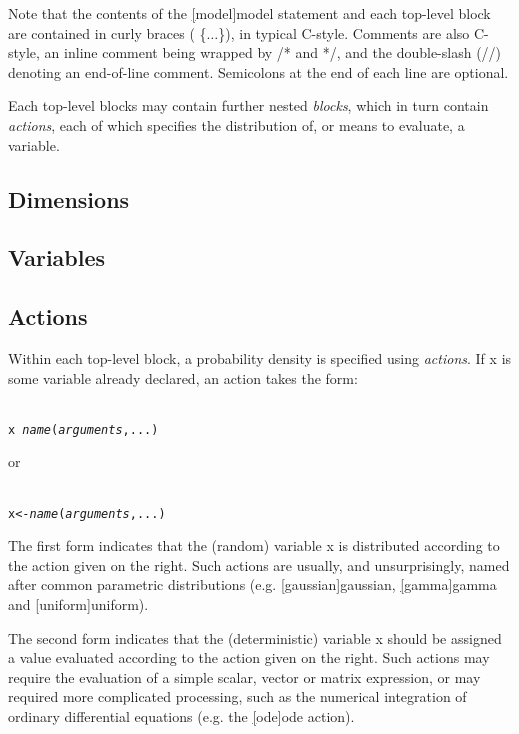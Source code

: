 Note that the contents of the \hyperref[hyper][model]{\sf model}
statement and each top-level block are contained in curly braces ({\sf
\{\(\ldots\)\}}), in typical C-style. Comments are also C-style, an inline
comment being wrapped by \textsf{/*} and \textsf{*/}, and the double-slash
(\textsf{//}) denoting an end-of-line comment. Semicolons at the end of each
line are optional.

Each top-level blocks may contain further nested \emph{blocks}, which
in turn contain \emph{actions}, each of which specifies the distribution of,
or means to evaluate, a variable.

\subsection{Dimensions\label{Dimensions}}

\subsection{Variables\label{Variables}}

\subsection{Actions\label{Actions}}

Within each top-level block, a probability density is specified using
\emph{actions}. If \textsf{x} is some variable already declared, an action
takes the form:
\begin{alltt}{\sf
    x ~ \textsl{name}(\textsl{arguments}, ...)
}\end{alltt}
or
\begin{alltt}{\sf
    x <- \textsl{name}(\textsl{arguments}, ...)
}\end{alltt}

The first form indicates that the (random) variable \textsf{x} is distributed
according to the action given on the right. Such actions are usually, and
unsurprisingly, named after common parametric distributions (e.g.
\hyperref[hyper][gaussian]{\sf gaussian},
\hyperref[hyper][gamma]{\sf gamma} and
\hyperref[hyper][uniform]{\sf uniform}).

The second form indicates that the (deterministic) variable \textsf{x} should
be assigned a value evaluated according to the action given on the right. Such
actions may require the evaluation of a simple scalar, vector or matrix
expression, or may required more complicated processing, such as the numerical
integration of ordinary differential equations (e.g. the \hyperref[hyper][ode]{\sf ode} action).

